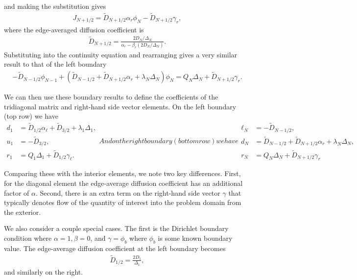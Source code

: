 and making the substitution gives
\begin{align}
  J_{N+1/2} = \widetilde{D}_{N+1/2} \alpha_r \phi_{N} - \widetilde{D}_{N+1/2} \gamma_r,
\end{align}
where the edge-averaged diffusion coefficient is
\begin{align}
  \widetilde{D}_{N+1/2} = \frac{ 2 D_{N} / \Delta_{N} }{ \alpha_r - \beta_r ( 2 D_{N} / \Delta_{N} ) } .
\end{align}
Substituting into the continuity equation and rearranging gives a very similar result to that of the left boundary
\begin{align}
  -\widetilde{D}_{N-1/2} \phi_{N-1} + \left( \widetilde{D}_{N-1/2} + \widetilde{D}_{N+1/2} \alpha_r + \lambda_{N} \Delta_{N} \right) \phi_{N} = Q_{N} \Delta_{N} + \widetilde{D}_{N+1/2} \gamma_r .
\end{align}

We can then use these boundary results to define the coefficients of the tridiagonal matrix and right-hand side vector elements. On the left boundary (top row) we have
\begin{subequations}
\begin{align}
  d_1 &= \widetilde{D}_{1/2} \alpha_\ell + \widetilde{D}_{3/2} + \lambda_1 \Delta_1, \\
  u_1 &= - \widetilde{D}_{3/2}, \\
  r_1 &= Q_1 \Delta_1 + \widetilde{D}_{1/2} \gamma_\ell .
\end{align}
And on the right boundary (bottom row) we have
\begin{align}
  \ell_{N} &= -\widetilde{D}_{N-1/2} , \\
  d_{N}	   &= \widetilde{D}_{N-1/2} + \widetilde{D}_{N+1/2} \alpha_r + \lambda_{N} \Delta_{N} , \\
  r_{N}    &= Q_{N} \Delta_{N} + \widetilde{D}_{N+1/2} \gamma_r 
\end{align}
\end{subequations}

Comparing these with the interior elements, we note two key differences. First, for the diagonal element the edge-average diffusion coefficient has an additional factor of $\alpha$. Second, there is an extra term on the right-hand side vector $\gamma$ that typically denotes flow of the quantity of interest into the problem domain from the exterior.

We also consider a couple special cases. The first is the Dirichlet boundary condition where $\alpha = 1, \beta = 0$, and $\gamma = \phi_b$ where $\phi_b$ is some known boundary value. The edge-average diffusion coefficient at the left boundary becomes
\begin{align}
  \widetilde{D}_{1/2} = \frac{2 D_1}{\Delta_1},
\end{align}
and similarly on the right.


